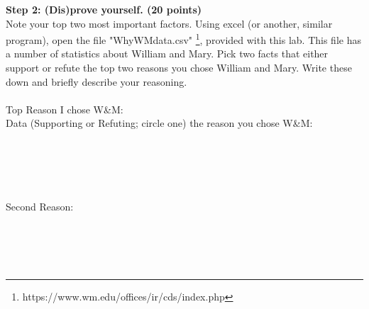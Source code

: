 \documentclass{article}
\begin{document}
\newpage
\textbf{Step 2: (Dis)prove yourself. (20 points)}\\
Note your top two most important factors.  Using excel (or another, similar program), open the file  "WhyWMdata.csv" \footnote{https://www.wm.edu/offices/ir/cds/index.php}, provided with this lab.  This file has a number of statistics about William and Mary.  Pick two facts that either support or refute the top two reasons you chose William and Mary. Write these down and briefly describe your reasoning.\\
\vspace{0.5mm} \\
Top Reason I chose W\&M: \underline{\hspace{3cm}}\\
Data (Supporting or Refuting; circle one) the reason you chose W\&M:\\
\vspace{0.5mm} 
\underline{\hspace{15cm}}\\
\vspace{0.5mm}
\underline{\hspace{15cm}}\\
\vspace{0.5mm}
\underline{\hspace{15cm}}\\
\vspace{0.5mm}
\underline{\hspace{15cm}}\\
\vspace{1.0mm}\\
Second Reason: \underline{\hspace{3cm}}\\
\vspace{0.5mm}
\underline{\hspace{15cm}}\\
\vspace{0.5mm}
\underline{\hspace{15cm}}\\
\vspace{0.5mm}
\underline{\hspace{15cm}}\\
\vspace{0.5mm}
\underline{\hspace{15cm}}\\
\end{document}

